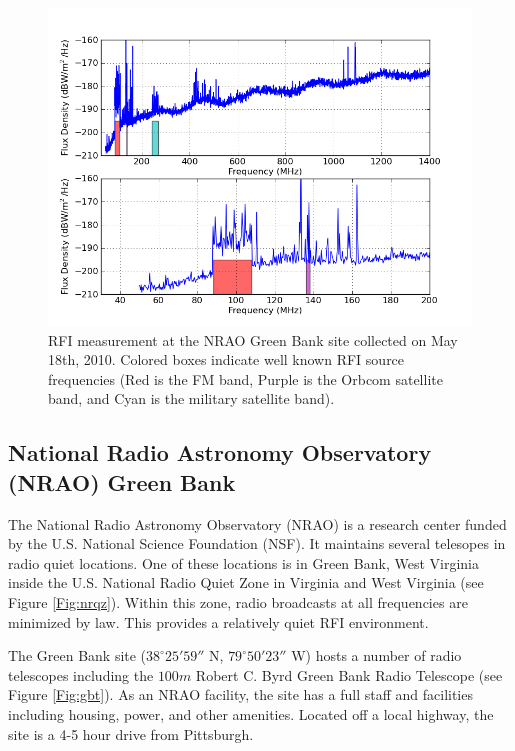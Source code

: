 \begin{figure}[htb]
\begin{center}
\includegraphics[width=0.9\linewidth]{RFI_testing/figures/GBT_bands.png}
\caption{RFI measurement at the NRAO Green Bank site collected on May 18th, 2010. Colored boxes indicate well known RFI source frequencies (Red is the FM band, Purple is the Orbcom satellite band, and Cyan is the military satellite band). }
\label{Fig:gbtrfi}
\end{center}
\end{figure}


\subsection{National Radio Astronomy Observatory (NRAO) Green Bank}

The National Radio Astronomy Observatory (NRAO) is a research center funded by the U.S. National Science Foundation (NSF). It maintains several telesopes in radio quiet locations. One of these locations is in Green Bank, West Virginia inside the U.S. National Radio Quiet Zone in Virginia and West Virginia (see Figure \ref{Fig:nrqz}). Within this zone, radio broadcasts at all frequencies are minimized by law. This provides a relatively quiet RFI environment. 

The Green Bank site ($38^\circ 25' 59''$ N, $79^\circ 50' 23''$ W) hosts a number of radio telescopes including the $100 m$ Robert C. Byrd Green Bank Radio Telescope (see Figure \ref{Fig:gbt}). As an NRAO facility, the site has a full staff and facilities including housing, power, and other amenities. Located off a local highway, the site is a 4-5 hour drive from Pittsburgh. 

